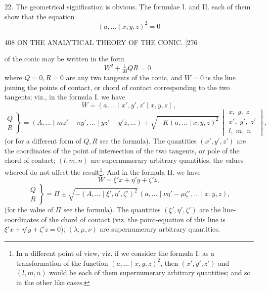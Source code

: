 \documentclass[11pt]{article}
\begin{document}
\textsc{22.} The geometrical signification is obvious. The formulae \textsc{I.} and \textsc{II.} each of
them show that the equation
\[ (a,\dots \mid x,y,z)^{2}=0 \]

\begin{center}
408 \hfill ON THE ANALYTICAL THEORY OF THE CONIC. \hfill \textsc{[276}
\end{center}

of the conic may be written in the form
\[ W^{2}+\tfrac{1}{M}QR=0, \]
where $Q=0,R=0$ are any two tangents of the conic, and $W=0$ is the line joining
the points of contact, or chord of contact corresponding to the two tangents; viz., in
the formula \textsc{I.} we have
\[ W=(a,\dots \mid x',y',z' \mid x,y,z), \]
\[ \left.\begin{aligned}Q\\ R\end{aligned}\right\}=
(A,\dots \mid mz'-ny',\dots \mid yz'-y'z,\dots)\pm\sqrt{-K(a,\dots \mid x,y,z)^{2}}\,
\begin{vmatrix}x,\;y,\;z\\ x',\;y',\;z'\\ l,\;m,\;n\end{vmatrix}, \]
(or for a different form of $Q,R$ see the formula). The quantities $(x',y',z')$ are the
coordinates of the point of intersection of the two tangents, or pole of the chord of
contact; $(l,m,n)$ are supernumerary arbitrary quantities, the values whereof do not
affect the result\footnote{In a different point of view, viz. if we consider the formula \textsc{I.} as a transformation of the function
$(a,\dots \mid x,y,z)^{2}$, then $(x',y',z')$ and $(l,m,n)$ would be each of them supernumerary arbitrary quantities;
and so in the other like cases.}. And in the formula \textsc{II.} we have
\[ W = \xi' x+\eta' y+\zeta' z, \]
\[ \left.\begin{aligned}Q\\ R\end{aligned}\right\}=\Pi\pm\sqrt{-(A,\dots \mid \xi',\eta',\zeta')^{2}}\,(a,\dots \mid \nu\eta'-\mu\zeta',\dots \mid x,y,z), \]
(for the value of $\Pi$ see the formula). The quantities $(\xi',\eta',\zeta')$ are the line-
coordinates of the chord of contact (viz. the point-equation of this line is $\xi' x+\eta' y+\zeta' z=0$);
$(\lambda,\mu,\nu)$ are supernumerary arbitrary quantities.
\end{document}
